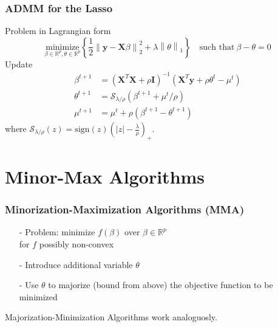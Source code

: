 \documentclass{beamer}
\newcommand{\R}{\mathbb{R}}
\newcommand{\Norm}[1]{\left\lVert#1\right\rVert}
\newcommand{\norm}[1]{\left\lvert#1\right\rvert}
\begin{document}
\begin{frame}
\frametitle{ADMM for the Lasso}
Problem in Lagrangian form
\[\underset{\beta\in\R^p,\theta\in\R^p}{\text{minimize}}\left\{\frac{1}{2}\Norm{\mathbf{y}-\mathbf{X}\beta}_2^2+\lambda\Norm{\theta}_1\right\}\quad \text{such that}\ \beta-\theta=0 \]
Update
\begin{align*}
\beta^{t+1}&=(\mathbf{X}^T\mathbf{X}+\rho\mathbf{I})^{-1}(\mathbf{X}^T\mathbf{y}+\rho\theta^t-\mu^t)\\
\theta^{t+1}&=\mathcal{S}_{\lambda/\rho}(\beta^{t+1}+\mu^t/\rho)\\
\mu^{t+1}&=\mu^t+\rho(\beta^{t+1}-\theta^{t+1})
\end{align*}
where $\mathcal{S}_{\lambda/\rho}(z)=\text{sign}(z)(\norm{z}-\frac{\lambda}{\rho})_+$.
\end{frame}


\section{Minor-Max Algorithms}

\begin{frame}
\frametitle{Minorization-Maximization Algorithms (MMA)}
\begin{itemize}
\item[-] Problem: minimize $f(\beta)$ over $\beta\in\R^p$\\ for $f$ possibly non-convex
\item[-] Introduce additional variable $\theta$
\item[-] Use $\theta$ to majorize (bound from above) the objective function to be minimized
\end{itemize}






{\small Majorization-Minimization Algorithms work analoguosly.}
\end{frame}
\end{document}
